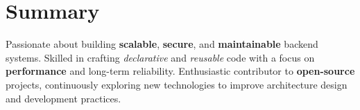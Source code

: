 \section{Summary}

\begin{onecolentry}
	Passionate about building \textbf{scalable}, \textbf{secure}, and \textbf{maintainable} backend systems.
	Skilled in crafting \textit{declarative} and \textit{reusable} code with a focus on \textbf{performance}
	and long-term reliability. Enthusiastic contributor to \textbf{open-source} projects, continuously
	exploring new technologies to improve architecture design and development practices.
\end{onecolentry}
